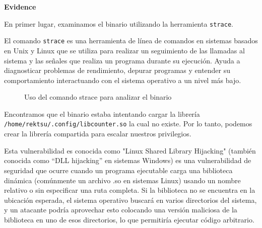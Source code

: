 \documentclass[a4paper]{article} %
\begin{document}
    \textbf{Evidence}

    En primer lugar, examinamos el binario utilizando la herramienta \texttt{strace}.

    \begin{definicion}
        El comando \texttt{strace} es una herramienta de línea de comandos en sistemas basados en Unix y Linux que se utiliza para realizar un seguimiento de las llamadas al sistema y las señales que realiza un programa durante su ejecución. Ayuda a diagnosticar problemas de rendimiento, depurar programas y entender su comportamiento interactuando con el sistema operativo a un nivel más bajo.
    \end{definicion}

    \clearpage

    \begin{figure}[h]
        \centering
        \setlength{\fboxrule}{0.5pt}
        \caption{Uso del comando strace para analizar el binario}
    \end{figure}

    Encontramos que el binario estaba intentando cargar la librería \texttt{/home/rektsu/.config/libcounter.so} la cual no existe. Por lo tanto, podemos crear la librería compartida para escalar nuestros privilegios.

    Esta vulnerabilidad es conocida como "Linux Shared Library Hijacking" (también conocida como “DLL hijacking” en sistemas Windows) es una vulnerabilidad de seguridad que ocurre cuando un programa ejecutable carga una biblioteca dinámica (comúnmente un archivo .so en sistemas Linux) usando un nombre relativo o sin especificar una ruta completa. Si la biblioteca no se encuentra en la ubicación esperada, el sistema operativo buscará en varios directorios del sistema, y un atacante podría aprovechar esto colocando una versión maliciosa de la biblioteca en uno de esos directorios, lo que permitiría ejecutar código arbitrario.
\end{document}

